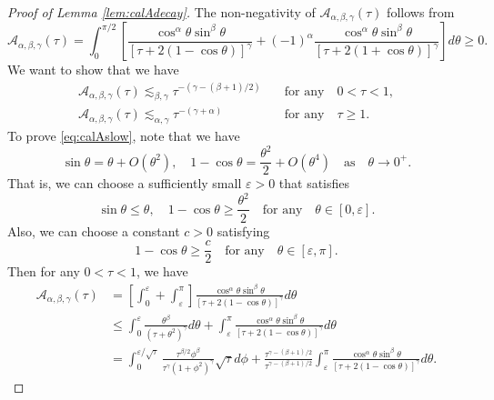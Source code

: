 \documentclass[11pt]{amsart}
\theoremstyle{definition}
\theoremstyle{remark}
\numberwithin{equation}{section}
\numberwithin{equation}{section}
\newcommand{\0}{\emptyset}
\newcommand{\ift}{\infty}
\newcommand{\alp}{\alpha}
\newcommand{\bt}{\beta}
\newcommand{\gmm}{\gamma}
\newcommand{\veps}{\varepsilon}
\newcommand{\tht}{\theta}
\newcommand{\calA}{\mathcal A}
\begin{document}
	\begin{proof}[Proof of Lemma \ref{lem:calAdecay}]
		The non-negativity of $\calA_{\alp,\bt,\gmm}(\tau)$ follows from
		\begin{equation}
			\calA_{\alp,\bt,\gmm}(\tau)=\int_{0}^{\pi/2}\left[ \frac{\cos^{\alp}\tht\sin^{\bt}\tht}{[\tau+2(1-\cos\tht)]^{\gmm}}+(-1)^{\alp}\frac{\cos^{\alp}\tht\sin^{\bt}\tht}{[\tau+2(1+\cos\tht)]^{\gmm}}\right]d\tht\geq0.
		\end{equation}
		We want to show that we have
		\begin{align}
			\calA_{\alp,\bt,\gmm}(\tau)\lesssim_{\bt,\gmm}\tau^{-(\gmm-(\bt+1)/2)}%
			&\quad\text{for any}%
			\quad 0<\tau<1,%
			\label{eq:calAslow}\\
			\calA_{\alp,\bt,\gmm}(\tau)\lesssim_{\alp,\gmm}\tau^{-(\gmm+\alp)}%
			&\quad\text{for any}%
			\quad \tau\geq1.%
			\label{eq:calAfast}
		\end{align}
		To prove \eqref{eq:calAslow}, note that we have
		\begin{equation}
			\sin\tht=\tht+O(\tht^{2}),\quad 1-\cos\tht=\frac{\tht^{2}}{2}+O(\tht^{4})\quad\text{as}\quad \tht\to0^{+}.
		\end{equation}
		That is, we can choose a sufficiently small $\veps>0$ that satisfies
		\begin{equation}
			\sin\tht\leq \tht,\quad 1-\cos\tht\geq \frac{\tht^{2}}{2}\quad\text{for any}\quad \tht\in[0,\veps].
		\end{equation}
		Also, we can choose a constant $c>0$ satisfying
		\begin{equation}
			1-\cos\tht\geq \frac{c}{2}\quad\text{for any}\quad \tht\in [\veps,\pi].
		\end{equation}
		Then for any $0<\tau<1$, %
		we have
		\begin{equation}
			\begin{aligned}
				\calA_{\alp,\bt,\gmm}(\tau)&=\left[\int_{0}^{\veps}+\int_{\veps}^{\pi}\right]\frac{\cos^{\alp}\tht\sin^{\bt}\tht}{[\tau+2(1-\cos\tht)]^{\gmm}}d\tht\\
				&\leq \int_{0}^{\veps}\frac{\tht^{\bt}}{(\tau+\tht^{2})^{\gmm}}d\tht+\int_{\veps}^{\pi}\frac{\cos^{\alp}\tht\sin^{\bt}\tht}{[\tau+2(1-\cos\tht)]^{\gmm}}d\tht\\
				&=\int_{0}^{\veps/\sqrt{\tau}}\frac{\tau^{\bt/2}\phi^{\bt}}{\tau^{\gmm}(1+\phi^{2})^{\gmm}}\sqrt{\tau}d\phi+\frac{\tau^{\gmm-(\bt+1)/2}}{\tau^{\gmm-(\bt+1)/2}}\int_{\veps}^{\pi}\frac{\cos^{\alp}\tht\sin^{\bt}\tht}{[\tau+2(1-\cos\tht)]^{\gmm}}d\tht.
			\end{aligned}
		\end{equation}
		

\end{proof}
\end{document}
